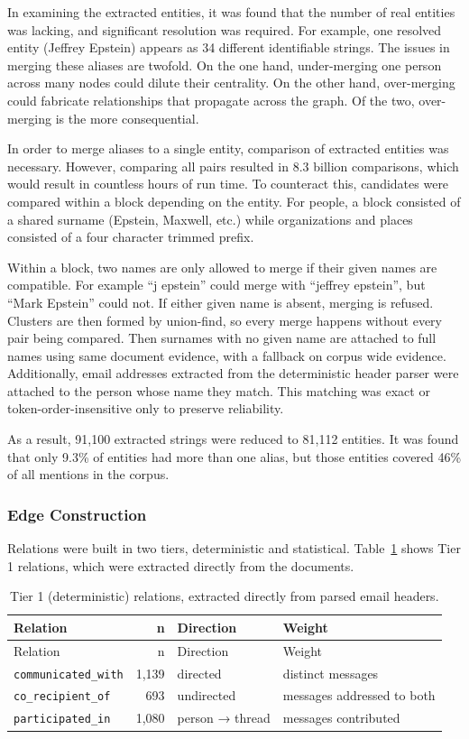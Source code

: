 \documentclass[
  letterpaper,
  DIV=11,
  numbers=noendperiod]{scrartcl}
\begin{document}
In examining the extracted entities, it was found that the number of
real entities was lacking, and significant resolution was required. For
example, one resolved entity (Jeffrey Epstein) appears as 34 different
identifiable strings. The issues in merging these aliases are twofold.
On the one hand, under-merging one person across many nodes could dilute
their centrality. On the other hand, over-merging could fabricate
relationships that propagate across the graph. Of the two, over-merging
is the more consequential.

In order to merge aliases to a single entity, comparison of extracted
entities was necessary. However, comparing all pairs resulted in 8.3
billion comparisons, which would result in countless hours of run time.
To counteract this, candidates were compared within a block depending on
the entity. For people, a block consisted of a shared surname (Epstein,
Maxwell, etc.) while organizations and places consisted of a four
character trimmed prefix.

Within a block, two names are only allowed to merge if their given names
are compatible. For example ``j epstein'' could merge with ``jeffrey
epstein'', but ``Mark Epstein'' could not. If either given name is
absent, merging is refused. Clusters are then formed by union-find, so
every merge happens without every pair being compared. Then surnames
with no given name are attached to full names using same document
evidence, with a fallback on corpus wide evidence. Additionally, email
addresses extracted from the deterministic header parser were attached
to the person whose name they match. This matching was exact or
token-order-insensitive only to preserve reliability.

As a result, 91,100 extracted strings were reduced to 81,112 entities.
It was found that only 9.3\% of entities had more than one alias, but
those entities covered 46\% of all mentions in the corpus.

\subsubsection{Edge Construction}\label{edge-construction}

Relations were built in two tiers, deterministic and statistical.
Table~\ref{tbl-tier1} shows Tier 1 relations, which were extracted
directly from the documents.

\begin{longtable}[]{@{}lrll@{}}
\caption{Tier 1 (deterministic) relations, extracted directly from
parsed email headers.}\label{tbl-tier1}\tabularnewline
\toprule\noalign{}
Relation & n & Direction & Weight \\
\midrule\noalign{}
\endfirsthead
\toprule\noalign{}
Relation & n & Direction & Weight \\
\midrule\noalign{}
\endhead
\bottomrule\noalign{}
\endlastfoot
\texttt{communicated\_with} & 1,139 & directed & distinct messages \\
\texttt{co\_recipient\_of} & 693 & undirected & messages addressed to
both \\
\texttt{participated\_in} & 1,080 & person → thread & messages
contributed \\
\end{longtable}
\end{document}
